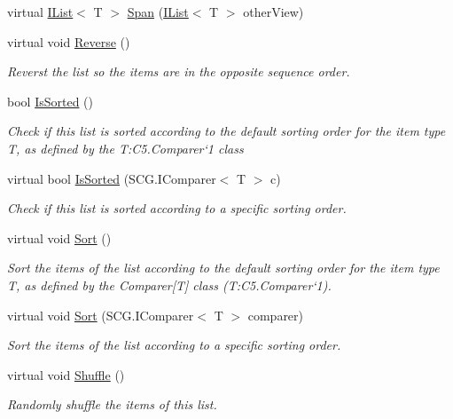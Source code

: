 \begin{DoxyCompactItemize}
virtual \hyperlink{interface_c5_1_1_i_list}{I\+List}$<$ T $>$ \hyperlink{class_c5_1_1_hashed_array_list_a331f3c151db6a30da1bc11dbed9c3119}{Span} (\hyperlink{interface_c5_1_1_i_list}{I\+List}$<$ T $>$ other\+View)
\item 
virtual void \hyperlink{class_c5_1_1_hashed_array_list_a79bae38c188939659db04f3a90869122}{Reverse} ()
\begin{DoxyCompactList}\small\item\em Reverst the list so the items are in the opposite sequence order. \end{DoxyCompactList}\item 
bool \hyperlink{class_c5_1_1_hashed_array_list_a7d8165aa133bc45c19481e7d74d2ceb7}{Is\+Sorted} ()
\begin{DoxyCompactList}\small\item\em Check if this list is sorted according to the default sorting order for the item type T, as defined by the T\+:\+C5.\+Comparer`1 class \end{DoxyCompactList}\item 
virtual bool \hyperlink{class_c5_1_1_hashed_array_list_a4ad671797c33a01e7faf008c184bfdc6}{Is\+Sorted} (S\+C\+G.\+I\+Comparer$<$ T $>$ c)
\begin{DoxyCompactList}\small\item\em Check if this list is sorted according to a specific sorting order. \end{DoxyCompactList}\item 
virtual void \hyperlink{class_c5_1_1_hashed_array_list_a8e3acdf07e2b45b9e1be1a1774edbfb9}{Sort} ()
\begin{DoxyCompactList}\small\item\em Sort the items of the list according to the default sorting order for the item type T, as defined by the Comparer\mbox{[}T\mbox{]} class (T\+:\+C5.\+Comparer`1). \end{DoxyCompactList}\item 
virtual void \hyperlink{class_c5_1_1_hashed_array_list_a3e2208ed8af4641d9e9ce503e43066c7}{Sort} (S\+C\+G.\+I\+Comparer$<$ T $>$ comparer)
\begin{DoxyCompactList}\small\item\em Sort the items of the list according to a specific sorting order. \end{DoxyCompactList}\item 
virtual void \hyperlink{class_c5_1_1_hashed_array_list_add0d88b73c89c2262c39e7b117acc4a2}{Shuffle} ()
\begin{DoxyCompactList}\small\item\em Randomly shuffle the items of this list. \end{DoxyCompactList}\item 

\end{DoxyCompactItemize}
